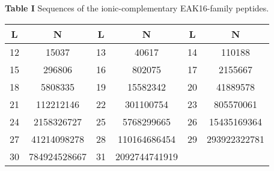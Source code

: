 \documentclass[preprint,preprintnumbers,amsmath,amssymb,showpacs,aps,pre]{revtex4-1}
\begin{document}
\vspace{0.5cm}
\parindent 0pt {\large {\bf Table I}}
Sequences of the ionic-complementary EAK16-family peptides.

\newpage

\begin{table}
  \centering
  \begin{tabular}[t]{cc|cc|cc}
    \toprule
     L & N  & L & N & L & N \\
    \hline
     12 & 15037 &
     13 & 40617 &
     14 & 110188 \\
     15 & 296806 &
     16 & 802075 &
     17 & 2155667 \\
     18 & 5808335 &
     19 & 15582342 &
     20 & 41889578 \\
     21 & 112212146 &
     22 & 301100754 &
     23 & 805570061 \\
     24 & 2158326727 &
     25 & 5768299665 &
     26 & 15435169364 \\
     27 & 41214098278 &
     28 & 110164686454 &
     29 & 293922322781 \\
     30 & 784924528667 &
     31 & 2092744741919 &
        & \\
    \toprule
  \end{tabular}
\end{table}

\end{document}
